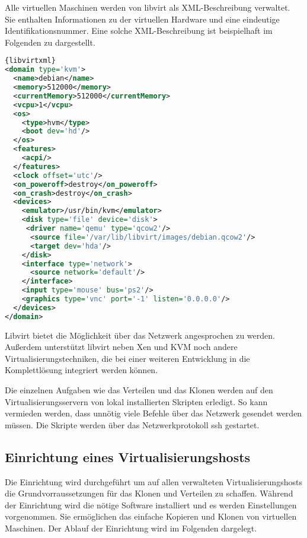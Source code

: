 Alle virtuellen Maschinen werden von libvirt als XML-Beschreibung verwaltet. Sie enthalten Informationen zu der virtuellen Hardware und eine eindeutige Identifikationsnummer. Eine solche XML-Beschreibung ist beispielhaft im Folgenden zu dargestellt.
\\
\begin{lstlisting}[caption=libvirt-XML Beispiel,language=XML,label=libvirtxml]{libvirtxml}
<domain type='kvm'>
  <name>debian</name>
  <memory>512000</memory>
  <currentMemory>512000</currentMemory>
  <vcpu>1</vcpu>
  <os>
    <type>hvm</type>
    <boot dev='hd'/>
  </os>
  <features>
    <acpi/>
  </features>
  <clock offset='utc'/>
  <on_poweroff>destroy</on_poweroff>
  <on_crash>destroy</on_crash>
  <devices>
    <emulator>/usr/bin/kvm</emulator>
    <disk type='file' device='disk'>
     <driver name='qemu' type='qcow2'/>
      <source file='/var/lib/libvirt/images/debian.qcow2'/>
      <target dev='hda'/>
    </disk>
    <interface type='network'>
      <source network='default'/>
    </interface>
    <input type='mouse' bus='ps2'/>
    <graphics type='vnc' port='-1' listen='0.0.0.0'/>
  </devices>
</domain>
\end{lstlisting}

Libvirt bietet die Möglichkeit über das Netzwerk angesprochen zu werden. Außerdem unterstützt libvirt neben Xen und KVM noch andere Virtualisierungstechniken, die bei einer weiteren Entwicklung in die Komplettlösung integriert werden können. %

Die einzelnen Aufgaben wie das Verteilen und das Klonen werden auf den Virtualisierungsservern von lokal installierten Skripten erledigt. So kann vermieden werden, dass unnötig viele Befehle über das Netzwerk gesendet werden müssen. Die Skripte werden über das Netzwerkprotokoll ssh gestartet.


\subsection{Einrichtung eines Virtualisierungshosts}\label{einrichtung}
Die Einrichtung wird durchgeführt um auf allen verwalteten Virtualisierungshosts die Grundvorraussetzungen für das Klonen und Verteilen zu schaffen. Während der Einrichtung wird die nötige Software installiert und es werden Einstellungen vorgenommen. Sie ermöglichen das einfache Kopieren und Klonen von virtuellen Maschinen. Der Ablauf der Einrichtung wird im Folgenden dargelegt. 


